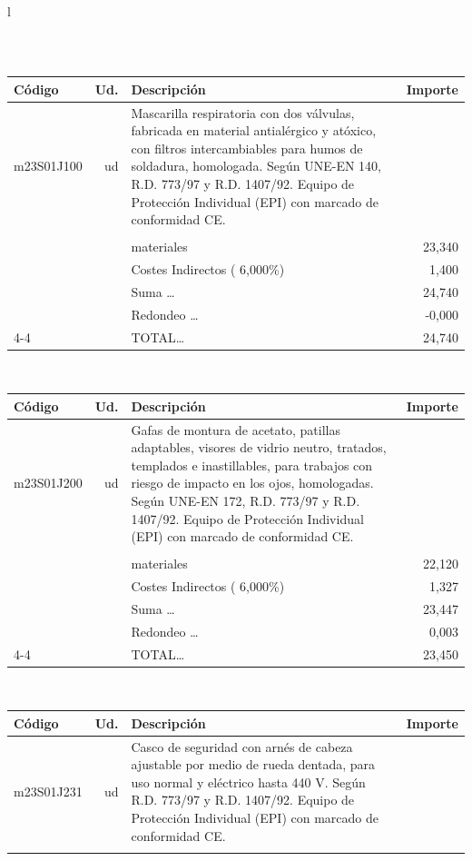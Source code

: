 \documentclass{book}%
\begin{document}
\begin{longtable}{l}
\begin{tabular}{l r p{60mm} r}
\end{tabular}\\%
\begin{tabular}{l r p{60mm} r}%
Código&Ud.&Descripción&Importe\\%
\hline%
m23S01J100&ud&Mascarilla respiratoria con dos válvulas, fabricada en material antialérgico y atóxico, con filtros intercambiables para humos de soldadura, homologada. Según UNE{-}EN 140, R.D. 773/97 y R.D. 1407/92. Equipo de Protección Individual (EPI) con marcado de conformidad CE.&\\%
&&&\\%
&&materiales&    23,340\\%
&&Costes Indirectos (     6,000\%)&     1,400\\%
&&Suma \ldots&    24,740\\%
&&Redondeo \ldots&    {-}0,000\\%
\cline{4-4}%
&&TOTAL\ldots&    24,740\\%
\end{tabular}\\%
\begin{tabular}{l r p{60mm} r}%
Código&Ud.&Descripción&Importe\\%
\hline%
m23S01J200&ud&Gafas de montura de acetato, patillas adaptables, visores de vidrio neutro, tratados, templados e inastillables, para trabajos con riesgo de impacto en los ojos, homologadas. Según UNE{-}EN 172, R.D. 773/97 y R.D. 1407/92. Equipo de Protección Individual (EPI) con marcado de conformidad CE.&\\%
&&&\\%
&&materiales&    22,120\\%
&&Costes Indirectos (     6,000\%)&     1,327\\%
&&Suma \ldots&    23,447\\%
&&Redondeo \ldots&     0,003\\%
\cline{4-4}%
&&TOTAL\ldots&    23,450\\%
\end{tabular}\\%
\begin{tabular}{l r p{60mm} r}%
Código&Ud.&Descripción&Importe\\%
\hline%
m23S01J231&ud&Casco de seguridad con arnés de cabeza ajustable por medio de rueda dentada, para uso normal y eléctrico hasta 440 V. Según R.D. 773/97 y R.D. 1407/92. Equipo de Protección Individual (EPI) con marcado de conformidad CE.&\\%
&&&\\%

\end{tabular}
\end{longtable}
\end{document}
